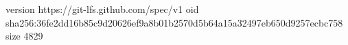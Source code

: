 version https://git-lfs.github.com/spec/v1
oid sha256:36fe2dd16b85c9d20626ef9a8b01b2570d5b64a15a32497eb650d9257ecbc758
size 4829
